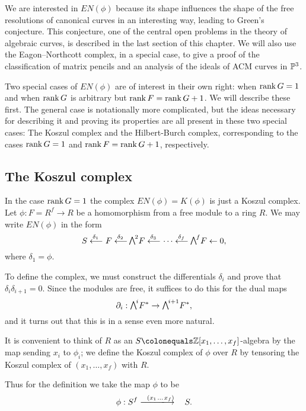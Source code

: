 We
are interested in $EN(\phi)$ because its shape
influences the shape of the free resolutions of canonical curves in an
interesting way,
leading to Green's conjecture. This conjecture, one of the central open
problems in the theory of algebraic curves, is described in the last
section of this chapter. We will also use the Eagon--Northcott
complex, in a special case, to give a proof of the classification of
matrix pencils and an analysis of the ideals of ACM curves in ${\mathbb P}^{3}$.

Two special cases of $EN(\phi)$ are of interest in their own right: when
$\operatorname{rank} G = 1$ and when
$\operatorname{rank} G$ is arbitrary but $\operatorname{rank} F = \operatorname{rank} G + 1$.
We
will describe these first. The general case
is notationally more complicated, but the  ideas necessary for
describing it and proving its properties
 are all
present in these two special cases: The Koszul complex and the Hilbert-Burch complex,
corresponding to the cases $\operatorname{rank} G = 1$ and $\operatorname{rank} F = \operatorname{rank} G+1$, respectively.


\subsection*{The Koszul complex}

In the case $\operatorname{rank} G = 1$ the complex $EN(\phi) = K(\phi)$ is just a
 Koszul complex. Let $\phi:F = R^{f}\to R$ be a homomorphism from
a free module to a ring $R$. We may write $EN(\phi)$ in the form
$$
S \luto{\,\delta_{1}} \!F \luto{\,\delta_{2}}\!\! \mwedge^{2}F
\luto{\,\delta_{3}} \!\cdots \luto{\,\delta_{f}}\!\!\mwedge^{f}F\leftarrow 0, 
$$
where $\delta_{1} = \phi$.

To define the complex, we must construct the differentials $\delta_{i}$
and prove that
$\delta_{i}\delta_{i+1} = 0$. Since the modules are free, it suffices
to do this for the
dual maps
$$
\partial_{i}: \mwedge^{i}F^{*} \to \mwedge^{i+1}F^{*},
$$
and it turns out that this is in a sense even more natural.

It is convenient to think of $R$ as an $S \colonequals  \ZZ[x_{1},\dots,
x_{f}]$-algebra by the map sending
$x_{i}$ to $\phi_{i}$; we  define the Koszul complex of $\phi$ over $R$
%
by tensoring
the Koszul complex of $(x_{1}, \dots, x_{f})$ with $R$.

Thus for the definition we take the map $\phi$ to be
$$
\phi: S^{f}\ruuuto {\ \
(x_{1} \,\dots \, x_{f})
} \hskip0.7em S.
$$

